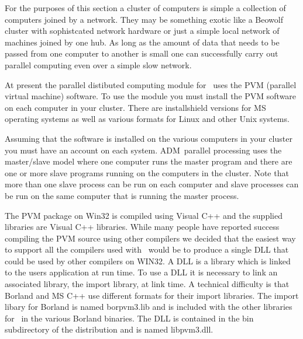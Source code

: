 
\def\kerntwo{\kern -4pt}

For the purposes of this section a cluster of computers is
simple a collection of computers joined by a network. They may be
something exotic like a Beowolf cluster with sophistcated
network hardware or just a simple local network of machines
joined by one hub. As long as the amount of data that needs to be passed
from one computer to another is small one can successfully carry out
parallel computing even over a simple slow network.

At present the parallel distibuted computing module for \ADM\
uses the PVM (parallel virtual machine) software. 
To use the module you must install the PVM software on each computer 
in your cluster. There are installshield versions for MS operating systems
as well as various formats for Linux and other Unix systems.

Assuming that the software is installed on the various computers in your cluster
you must have an account on each system. ADM\ parallel processing
uses the master/slave model where one computer runs the master program and
there are one or more slave programs running on the computers in the
cluster. Note that more than one slave process can be run on each computer
and slave processes can be run on the same computer that is running the
master process.

The PVM package on Win32 is compiled using Visual C++ and
the supplied libraries are Visual C++ libraries. While
many people have reported success compiling the PVM
source using other compilers we decided that the easiest
way to support all the compilers used with \ADM\ would
be to produce a single DLL that could be used by other
compilers on WIN32. A DLL is a library which is linked to
the users application at run time. To use a DLL it is necessary to link
an associated library, the import library, at link time.
A technical difficulty is that Borland and MS C++ use different
formats for their import libraries. The import libary for Borland
is named borpvm3.lib and is included with the other libraries for
\ADM\ in the various Borland binaries. The DLL is contained
in the bin subdirectory of the distribution and is named libpvm3.dll.


